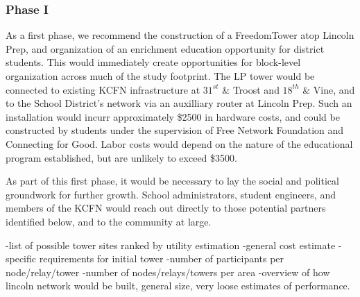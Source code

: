 \subsubsection{Phase I}
As a first phase, we recommend the construction of a FreedomTower atop Lincoln
Prep, and organization of an enrichment education opportunity for district
students. This would immediately create opportunities for block-level
organization across much of the study footprint. The LP tower would be
connected to existing KCFN infrastructure at $31^{st}$ \& Troost and $18^{th}$
\& Vine, and to the School District's network via an auxilliary router at
Lincoln Prep. Such an installation would incurr approximately \$2500 in hardware
costs, and could be constructed by students under the supervision of Free
Network Foundation and Connecting for Good. Labor costs would depend on the
nature of the educational program established, but are unlikely to exceed \$3500. \par
As part of this first phase, it would be necessary to lay the social and
political groundwork for further growth. School administrators, student
engineers, and members of the KCFN would reach out directly to those potential
partners identified below, and to the community at large.

-list of possible tower sites ranked by utility estimation
-general cost estimate
-specific requirements for initial tower
-number of participants per node/relay/tower
-number of nodes/relays/towers per area
-overview of how lincoln network would be built, general size, very loose
estimates of performance. 


